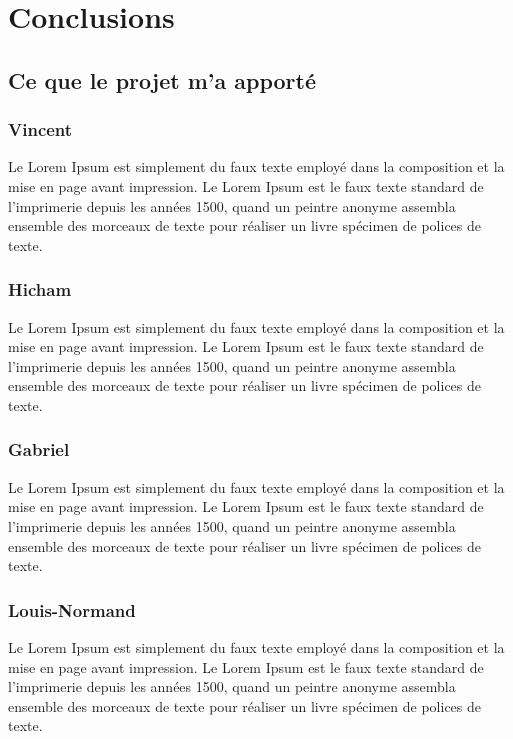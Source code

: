 

\section{Conclusions}
\subsection{Ce que le projet m'a apporté}
\begin{multicols}{4}

\subsubsection{Vincent}
Le Lorem Ipsum est simplement du faux texte employé dans la composition et la mise en page avant impression. Le Lorem Ipsum est le faux texte standard de l'imprimerie depuis les années 1500, quand un peintre anonyme assembla ensemble des morceaux de texte pour réaliser un livre spécimen de polices de texte.
\subsubsection{Hicham}
Le Lorem Ipsum est simplement du faux texte employé dans la composition et la mise en page avant impression. Le Lorem Ipsum est le faux texte standard de l'imprimerie depuis les années 1500, quand un peintre anonyme assembla ensemble des morceaux de texte pour réaliser un livre spécimen de polices de texte.
\subsubsection{Gabriel}
Le Lorem Ipsum est simplement du faux texte employé dans la composition et la mise en page avant impression. Le Lorem Ipsum est le faux texte standard de l'imprimerie depuis les années 1500, quand un peintre anonyme assembla ensemble des morceaux de texte pour réaliser un livre spécimen de polices de texte.
\subsubsection{Louis-Normand}
Le Lorem Ipsum est simplement du faux texte employé dans la composition et la mise en page avant impression. Le Lorem Ipsum est le faux texte standard de l'imprimerie depuis les années 1500, quand un peintre anonyme assembla ensemble des morceaux de texte pour réaliser un livre spécimen de polices de texte.
\end{multicols}

